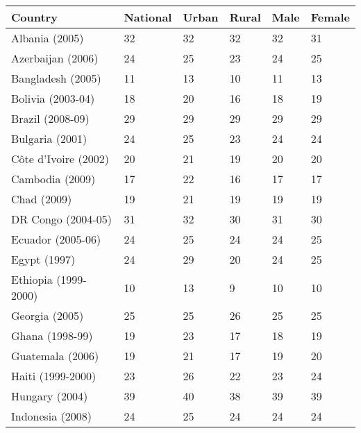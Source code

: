 \begin{multicols}{2}

}{}

\IfFileExists{./Plots/C.P1.HS.1.4.pdf}{\texttt{[image: \{./Plots/C.P1.HS.1.4]}.pdf}}{}
\end{multicols}
\clearpage

 \label{tab:title} 
      \begin{tabular}{L{2.0cm} R{0.7cm} R{0.7cm} R{0.7cm} R{0.7cm} R{0.7cm}}
      \toprule
      Country & National & Urban & Rural & Male & Female \\
      \midrule
        Albania (2005) & 32 & 32 & 32 & 32 & 31 \\
        Azerbaijan (2006) & 24 & 25 & 23 & 24 & 25 \\
        Bangladesh (2005) & 11 & 13 & 10 & 11 & 13 \\
        Bolivia (2003-04) & 18 & 20 & 16 & 18 & 19 \\
        Brazil (2008-09) & 29 & 29 & 29 & 29 & 29 \\
        Bulgaria (2001) & 24 & 25 & 23 & 24 & 24 \\
        C\^{o}te d'Ivoire (2002) & 20 & 21 & 19 & 20 & 20 \\
        Cambodia (2009) & 17 & 22 & 16 & 17 & 17 \\
        Chad (2009) & 19 & 21 & 19 & 19 & 19 \\
        DR Congo (2004-05) & 31 & 32 & 30 & 31 & 30 \\
        Ecuador (2005-06) & 24 & 25 & 24 & 24 & 25 \\
        Egypt (1997) & 24 & 29 & 20 & 24 & 25 \\
        Ethiopia (1999-2000) & 10 & 13 & 9 & 10 & 10 \\
        Georgia (2005) & 25 & 25 & 26 & 25 & 25 \\
        Ghana (1998-99) & 19 & 23 & 17 & 18 & 19 \\
        Guatemala (2006) & 19 & 21 & 17 & 19 & 20 \\
        Haiti (1999-2000) & 23 & 26 & 22 & 23 & 24 \\
        Hungary (2004) & 39 & 40 & 38 & 39 & 39 \\
        Indonesia (2008) & 24 & 25 & 24 & 24 & 24 \\

\end{tabular}
